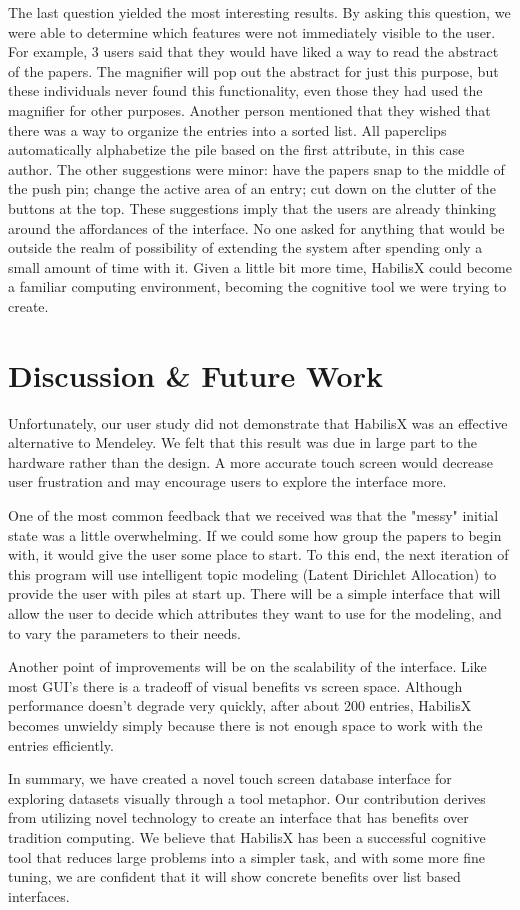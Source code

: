 \documentclass{article}
\begin{document}
	The last question yielded the most interesting results.  By asking this question, we were able to determine which features were not immediately visible to the user.  For example, 3 users said that they would have liked a way to read the abstract of the papers.  The magnifier will pop out the abstract for just this purpose, but these individuals never found this functionality, even those they had used the magnifier for other purposes.  Another person mentioned that they wished that there was a way to organize the entries into a sorted list.  All paperclips automatically alphabetize the pile based on the first attribute, in this case author.  The other suggestions were minor: have the papers snap to the middle of the push pin; change the active area of an entry; cut down on the clutter of the buttons at the top.  These suggestions imply that the users are already thinking around the affordances of the interface.  No one asked for anything that would be outside the realm of possibility of extending the system after spending only a small amount of time with it.   Given a little bit more time, HabilisX could become a familiar computing environment, becoming the cognitive tool we were trying to create.  


\section{Discussion \& Future Work}
Unfortunately, our user study did not demonstrate that HabilisX was an effective alternative to Mendeley.  We felt that this result was due in large part to the hardware rather than the design.  A more accurate touch screen would decrease user frustration and may encourage users to explore the interface more.  

One of the most common feedback that we received was that the "messy" initial state was a little overwhelming.  If we could some how group the papers to begin with, it would give the user some place to start.  To this end, the next iteration of this program will use intelligent topic modeling (Latent Dirichlet Allocation) to provide the user with piles at start up.  There will be a simple interface that will allow the user to decide which attributes they want to use for the modeling, and to vary the parameters to their needs.  

Another point of improvements will be on the scalability of the interface.  Like most GUI's there is a tradeoff of visual benefits vs screen space.  Although performance doesn't degrade very quickly, after about 200 entries, HabilisX becomes unwieldy simply because there is not enough space to work with the entries efficiently.  

In summary, we have created a novel touch screen database interface for exploring datasets visually through a tool metaphor.  Our contribution derives from utilizing novel technology to create an interface that has benefits over tradition computing.  We believe that HabilisX has been a successful cognitive tool that reduces large problems into a simpler task, and with some more fine tuning, we are confident that it will show concrete benefits over list based interfaces.  





%
{}
\end{document}
